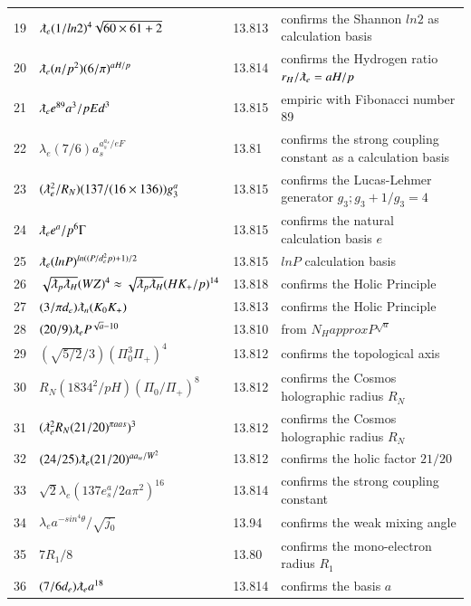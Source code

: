 \documentclass[a4paper,9pt]{article}
\begin{document}
\begin{appendix}
\begin{table}
\begin{tabular}{llll}
   19 & $\lambdabar_{e} (1/ln2)^4\sqrt{60 \times 61+2} $ & 13.813 & confirms the Shannon $ln2$ as calculation basis\\
   20 & $\lambdabar_{e} (n/p^2) (6/\pi)^{aH/p}$ & 13.814 & confirms the Hydrogen ratio $r_H/\lambdabar_e = aH/p$\\    
   21 & $\lambdabar_{e} e^{89}  a^3/p{Ed}^3$ & 13.815 & empiric with Fibonacci number 89\\    
   22 & $ \lambda_{e} (7/6) a_s^{a_s^{a_s}/eF}  $   & 13.81 & confirms the strong coupling constant as a calculation basis \\       
   23 & $(\lambdabar_{e}^2/R_N) (137/(16 \times 136)) g_3^a$ & 13.815 & confirms the Lucas-Lehmer generator $g_3 ; g_3 +1/g_3 = 4$ \\
   24 & $\lambdabar_{e} e^a/p^6\Gamma $ & 13.815 & confirms the natural calculation basis $e$ \\    
   25 & $\lambdabar_{e} (lnP)^{ln((P/d_e^2 p)+1)/2} $ & 13.815 & $lnP$ calculation basis \\
   26 & $  \sqrt{\lambdabar_{p} \lambdabar_{H}} (WZ)^4 \approx \sqrt{\lambdabar_{p} \lambdabar_{H}}  (HK_+/p)^{14} $ & 13.818 & confirms the Holic Principle \\
   27 & $ (3/\pi d_e)\lambdabar_{n} (K_0 K_+)  $ & 13.813 & confirms the Holic Principle \\
   28 & $ (20/9)\lambdabar_{e} P^{\sqrt a - 10 }  $ & 13.810 & from $ N_H approx P^{\sqrt a} $  \\    
   29 & $ (\sqrt{5/2}/3) ( \Pi_0^3 \Pi_+)^4 $ & 13.812 & confirms the topological axis  \\
   30 & $ R_N (1834^2/pH) ( \Pi_0 /\Pi_+)^8 $ & 13.812 & confirms the Cosmos holographic radius $R_N $  \\
   31 & $ (\lambdabar_e ^2R_N (21/20)^{\pi aas})^3$ & 13.812 & confirms the Cosmos holographic radius $R_N $  \\ 
   32 & $ (24/25) \lambdabar_e (21/20)^{aa_w/W^2} $ & 13.812 & confirms the holic factor $21/20$  \\
   33 & $ \sqrt2 \lambda_e (137 e^a_s/2a\pi^2)^{16} $ & 13.814 & confirms the strong coupling constant  \\     
   34 & $ \lambda_{e} a^{-sin^4\theta}/\sqrt {j_0}  $   & 13.94 & confirms the weak mixing angle \\ 
   35 & $7R_1/8  $   & 13.80 & confirms the mono-electron radius $R_1$ \\   
   36 & $ (7/6d_e) \lambdabar_{e} a^{18} $ & 13.814 & confirms the basis $a$ \\

\end{tabular}
\end{table}
\end{appendix}
\end{document}
